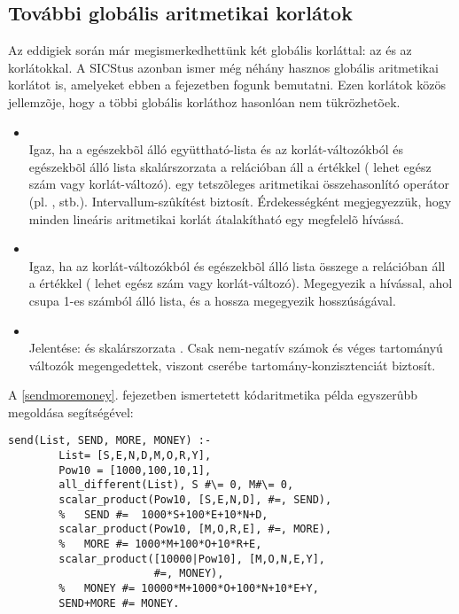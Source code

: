 \subsection{További globális aritmetikai korlátok}

Az eddigiek során már megismerkedhettünk két globális korláttal: az 
és az  korlátokkal. A SICStus azonban ismer még néhány hasznos
globális aritmetikai korlátot is, amelyeket ebben a fejezetben fogunk bemutatni. Ezen
korlátok közös jellemzõje, hogy a többi globális korláthoz hasonlóan nem tükrözhetõek.

\begin{itemize}
\item {} \\
Igaz, ha a  egészekbõl álló együttható-lista és az  korlát-változókból
és egészekbõl álló lista skalárszorzata a  relációban áll a 
értékkel ( lehet egész szám vagy korlát-változó).  egy tetszõleges
aritmetikai összehasonlító operátor (pl. \cd{\#=}, \cd{\#<} stb.). Intervallum-szûkítést
biztosít. Érdekességként megjegyezzük, hogy minden lineáris aritmetikai korlát
átalakítható egy megfelelõ  hívássá.

\item {} \\
Igaz, ha az  korlát-változókból és egészekbõl álló lista összege a 
relációban áll a  értékkel ( lehet egész szám vagy korlát-változó).
Megegyezik a  hívással, ahol 
csupa 1-es számból álló lista, és a hossza megegyezik  hosszúságával.

\item {} \\
Jelentése:  és  skalárszorzata . Csak nem-negatív
számok és véges tartományú változók megengedettek, viszont cserébe tartomány-konzisztenciát
biztosít.
\end{itemize}

A \ref{sendmoremoney}. fejezetben ismertetett kódaritmetika példa egyszerûbb megoldása
 segítségével:

\begin{verbatim}
send(List, SEND, MORE, MONEY) :-
        List= [S,E,N,D,M,O,R,Y], 
        Pow10 = [1000,100,10,1],
        all_different(List), S #\= 0, M#\= 0,
        scalar_product(Pow10, [S,E,N,D], #=, SEND),
        %   SEND #=  1000*S+100*E+10*N+D,
        scalar_product(Pow10, [M,O,R,E], #=, MORE),
        %   MORE #= 1000*M+100*O+10*R+E,
        scalar_product([10000|Pow10], [M,O,N,E,Y], 
                       #=, MONEY),
        %   MONEY #= 10000*M+1000*O+100*N+10*E+Y,
        SEND+MORE #= MONEY.
\end{verbatim}

